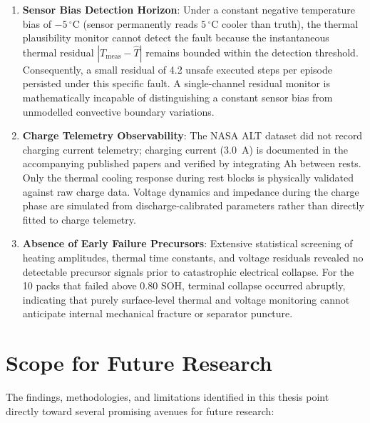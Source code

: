 \begin{enumerate}
  \item \textbf{Sensor Bias Detection Horizon}:
  Under a constant negative temperature bias of $-5\,^\circ\mathrm{C}$
  (sensor permanently reads $5\,^\circ\mathrm{C}$ cooler than truth),
  the thermal plausibility monitor cannot detect the fault because the
  instantaneous thermal residual $|T_{\mathrm{meas}} - \hat{T}|$ remains
  bounded within the detection threshold. Consequently, a small residual
  of 4.2 unsafe executed steps per episode persisted under this specific fault.
  A single-channel residual monitor is mathematically incapable of distinguishing
  a constant sensor bias from unmodelled convective boundary variations.

  \item \textbf{Charge Telemetry Observability}:
  The NASA ALT dataset did not record charging current telemetry; charging
  current (\SI{3.0}{A}) is documented in the accompanying published papers
  and verified by integrating Ah between rests. Only the thermal cooling
  response during rest blocks is physically validated against raw charge data.
  Voltage dynamics and impedance during the charge phase are simulated from
  discharge-calibrated parameters rather than directly fitted to charge telemetry.

  \item \textbf{Absence of Early Failure Precursors}:
  Extensive statistical screening of heating amplitudes, thermal time
  constants, and voltage residuals revealed no detectable precursor signals
  prior to catastrophic electrical collapse. For the 10 packs that failed
  above 0.80 SOH, terminal collapse occurred abruptly, indicating that
  purely surface-level thermal and voltage monitoring cannot anticipate
  internal mechanical fracture or separator puncture.
\end{enumerate}

\section{Scope for Future Research}

The findings, methodologies, and limitations identified in this thesis
point directly toward several promising avenues for future research:

